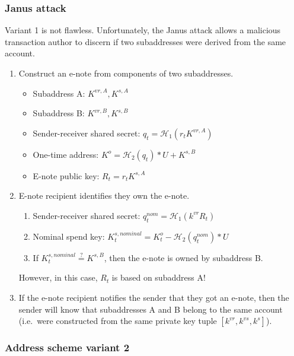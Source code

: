 \subsubsection{Janus attack}

Variant 1 is not flawless. Unfortunately, the Janus attack \cite{janus-attack} allows a malicious transaction author to discern if two subaddresses were derived from the same account.

\begin{enumerate}
    \item Construct an e-note from components of two subaddresses.
    \begin{itemize}
        \item Subaddress A: $K^{vr,A}, K^{s,A}$
        \item Subaddress B: $K^{vr,B}, K^{s,B}$
        \item Sender-receiver shared secret: $q_t = \mathcal{H}_1(r_t K^{vr,A})$
        \item One-time address: $K^o = \mathcal{H}_2(q_t)*U + K^{s,B}$
        \item E-note public key: $R_t = r_t K^{s,A}$
    \end{itemize}

    \item E-note recipient identifies they own the e-note.
    \begin{enumerate}
        \item Sender-receiver shared secret: $q^{nom}_t = \mathcal{H}_1(k^{vr} R_t)$
        \item Nominal spend key: $K^{s,nominal}_t = K^o_t - \mathcal{H}_2(q^{nom}_t)*U$
        \item If $K^{s,nominal}_t \stackrel{?}{=} K^{s,B}$, then the e-note is owned by subaddress B.
    \end{enumerate}
    
    However, in this case, $R_t$ is based on subaddress A!

    \item If the e-note recipient notifies the sender that they got an e-note, then the sender will know that subaddresses A and B belong to the same account (i.e.\ were constructed from the same private key tuple $[k^{vr}, k^{vs}, k^s]$).
\end{enumerate}

\subsubsection{Address scheme variant 2}

